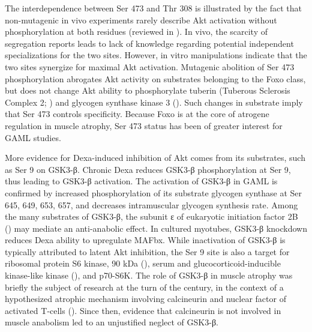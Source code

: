 \documentclass[12pt,english]{report}\usepackage[]{graphicx}\usepackage[]{color}
\begin{document}
The interdependence between Ser 473 and Thr 308 is illustrated by
the fact that non-mutagenic in vivo experiments rarely describe Akt
activation without phosphorylation at both residues (reviewed in \citep{manning2007akt/pkb}).
In vivo, the scarcity of segregation reports leads to lack of knowledge
regarding potential independent specializations for the two sites.
However, in vitro manipulations indicate that the two sites synergize
for maximal Akt activation\citep{alessi1996mechanism}. Mutagenic
abolition of Ser 473 phosphorylation abrogates Akt activity on substrates
belonging to the Foxo class, but does not change Akt ability to phosphorylate
tuberin (Tuberous Sclerosis Complex 2; )
and glycogen synthase kinase 3 ()\citep{jacinto2006sin1/mip1}.
Such changes in substrate imply that Ser 473 controls specificity.
Because Foxo is at the core of atrogene regulation in muscle atrophy,
Ser 473 status has been of greater interest for GAML studies.

More evidence for Dexa-induced inhibition of Akt comes from its substrates,
such as Ser 9 on GSK3-β. Chronic Dexa reduces GSK3-β phosphorylation
at Ser 9, thus leading to GSK3-β activation\citep{buren2008insulin}.
The activation of GSK3-β in GAML is confirmed by increased phosphorylation
of its substrate glycogen synthase at Ser 645, 649, 653, 657, and
decreases intramuscular glycogen synthesis rate\citep{ruzzin2005contraction,coderre2007regulation,buren2008insulin}.
Among the many substrates of GSK3-β, the subunit ε of eukaryotic initiation
factor 2B ()
may mediate an anti-anabolic effect\citep{welsh1993glycogen}. In
cultured myotubes, GSK3-β knockdown reduces Dexa ability to upregulate
MAFbx\citep{verhees2011glycogen}. While inactivation of GSK3-β is
typically attributed to latent Akt inhibition, the Ser 9 site is also
a target for ribosomal protein S6 kinase, 90 kDa (),
serum and glucocorticoid-inducible kinase-like kinase (),
and p70-S6K\citep{zhang2006s6k1,dai2002human,frame2001gsk3}. The
role of GSK3-β in muscle atrophy was briefly the subject of research
at the turn of the century, in the context of a hypothesized atrophic
mechanism involving calcineurin and nuclear factor of activated T-cells
(). Since
then, evidence that calcineurin is not involved in muscle anabolism\citep{sacheck2004igf-i}
led to an unjustified neglect of GSK3-β.
\end{document}
